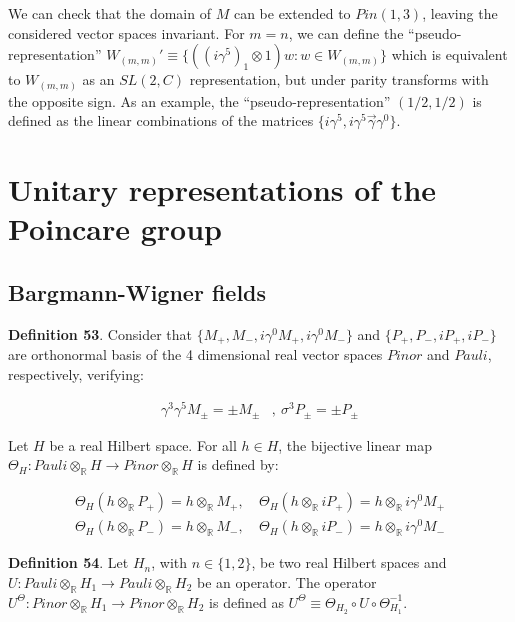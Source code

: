 \documentclass[11pt]{book}
\begin{document}
We can check that the domain of \(M\) can be extended to \(Pin(1,3)\),
leaving the considered vector spaces invariant. For \(m=n\), we can
define the ``pseudo-representation''
\(W_{(m,m)}'\equiv \{((i\gamma^5)_1\otimes 1) w: w\in W_{(m,m)}\}\)
which is equivalent to \(W_{(m,m)}\) as an \(SL(2,C)\) representation,
but under parity transforms with the opposite sign. As an example, the
``pseudo-representation'' \((1/2,1/2)\) is defined as the linear
combinations of the matrices
\(\{i\gamma^5,i\gamma^5\vec{\gamma}\gamma^0\}\).

\hypertarget{section:Poincare}{%
\section{Unitary representations of the Poincare
group}\label{section:Poincare}}

\hypertarget{bargmann-wigner-fields}{%
\subsection{Bargmann-Wigner fields}\label{bargmann-wigner-fields}}

\textbf{Definition 53}. Consider that
\(\{M_+,M_-,i\gamma^0M_+,i\gamma^0M_-\}\) and \(\{P_+,P_-,iP_+,iP_-\}\)
are orthonormal basis of the 4 dimensional real vector spaces \(Pinor\)
and \(Pauli\), respectively, verifying:

\begin{equation}\begin{aligned}
\gamma^3\gamma^5 M_\pm=\pm M_\pm&,\ \sigma^3 P_\pm=\pm P_\pm\end{aligned}\end{equation}

Let \(H\) be a real Hilbert space. For all \(h\in H\), the bijective
linear map
\(\Theta_H:Pauli\otimes_{\mathbb{R}} H\to Pinor\otimes_{\mathbb{R}}H\)
is defined by:

\begin{equation}\begin{aligned}
\Theta_H(h\otimes_{\mathbb{R}} P_+)=h\otimes_{\mathbb{R}} M_+,&\ \Theta_H(h \otimes_{\mathbb{R}}
iP_+)=h\otimes_{\mathbb{R}} i\gamma^0 M_+\\
\Theta_H(h\otimes_{\mathbb{R}} P_-)=h\otimes_{\mathbb{R}} M_-,&\ \Theta_H(h\otimes_{\mathbb{R}} iP_-)=h\otimes_{\mathbb{R}}i\gamma^0 M_-\end{aligned}\end{equation}

\textbf{Definition 54}. Let \(H_n\), with \(n\in\{1,2\}\), be two real
Hilbert spaces and \(U:Pauli\otimes_{\mathbb{R}} H_1\to
Pauli\otimes_{\mathbb{R}} H_2\) be an operator. The operator
\(U^\Theta:Pinor\otimes_{\mathbb{R}} H_1\to
Pinor\otimes_{\mathbb{R}} H_2\) is defined as \(U^\Theta\equiv
\Theta_{H_2}\circ U\circ \Theta^{-1}_{H_1}\).
\end{document}
